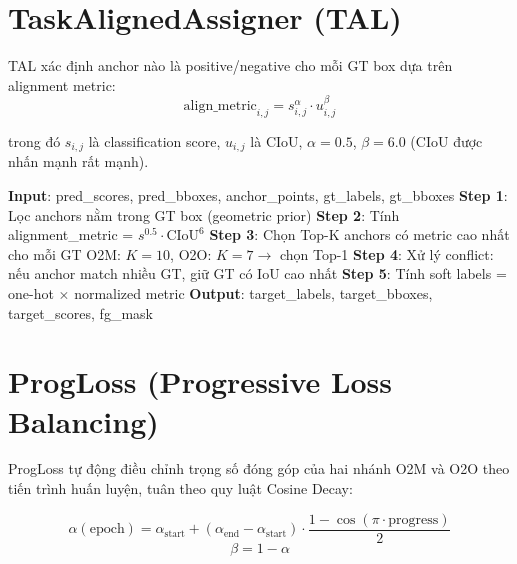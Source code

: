 \section{TaskAlignedAssigner (TAL)}
\label{sec:tal}

TAL xác định anchor nào là positive/negative cho mỗi GT box dựa trên alignment metric:
\begin{equation}
    \text{align\_metric}_{i,j} = s_{i,j}^{\alpha} \cdot u_{i,j}^{\beta}
    \label{eq:align_metric}
\end{equation}

\noindent trong đó $s_{i,j}$ là classification score, $u_{i,j}$ là CIoU, $\alpha = 0.5$, $\beta = 6.0$ (CIoU được nhấn mạnh rất mạnh).

\begin{algorithm}[H]
\caption{TaskAlignedAssigner}
\label{alg:tal}
\begin{algorithmic}[1]
\State \textbf{Input}: pred\_scores, pred\_bboxes, anchor\_points, gt\_labels, gt\_bboxes
\State \textbf{Step 1}: Lọc anchors nằm trong GT box (geometric prior)
\State \textbf{Step 2}: Tính alignment\_metric = $s^{0.5} \cdot \text{CIoU}^{6}$
\State \textbf{Step 3}: Chọn Top-K anchors có metric cao nhất cho mỗi GT
\Statex \quad\quad O2M: $K=10$, O2O: $K=7 \to$ chọn Top-1
\State \textbf{Step 4}: Xử lý conflict: nếu anchor match nhiều GT, giữ GT có IoU cao nhất
\State \textbf{Step 5}: Tính soft labels = one-hot $\times$ normalized metric
\State \textbf{Output}: target\_labels, target\_bboxes, target\_scores, fg\_mask
\end{algorithmic}
\end{algorithm}

\section{ProgLoss (Progressive Loss Balancing)}
\label{subsec:progloss}

ProgLoss tự động điều chỉnh trọng số đóng góp của hai nhánh O2M và O2O theo tiến trình huấn luyện, tuân theo quy luật Cosine Decay:

\begin{equation}
    \alpha(\text{epoch}) = \alpha_\text{start} + (\alpha_\text{end} - \alpha_\text{start}) \cdot \frac{1 - \cos(\pi \cdot \text{progress})}{2}
    \label{eq:progloss_alpha}
\end{equation}
\begin{equation}
    \beta = 1 - \alpha
\end{equation}

